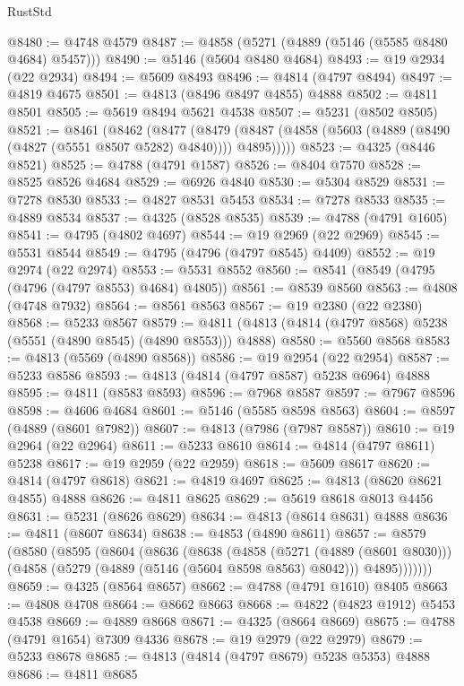 \begin{lexlean}{RustStd}
\begin{coremodule}
@8480 := @4748 @4579
@8487 := @4858 (@5271 (@4889 (@5146 (@5585 @8480 @4684) @5457)))
@8490 := @5146 (@5604 @8480 @4684)
@8493 := @19 @2934 (@22 @2934)
@8494 := @5609 @8493
@8496 := @4814 (@4797 @8494)
@8497 := @4819 @4675
@8501 := @4813 (@8496 @8497 @4855) @4888
@8502 := @4811 @8501
@8505 := @5619 @8494 @5621 @4538
@8507 := @5231 (@8502 @8505)
@8521 := @8461
    (@8462
      (@8477
        (@8479 (@8487 (@4858 (@5603 (@4889 (@8490 (@4827 (@5551 @8507 @5282) @4840)))) @4895)))))
@8523 := @4325 (@8446 @8521)
@8525 := @4788 (@4791 @1587)
@8526 := @8404 @7570
@8528 := @8525 @8526 @4684
@8529 := @6926 @4840
@8530 := @5304 @8529
@8531 := @7278 @8530
@8533 := @4827 @8531 @5453
@8534 := @7278 @8533
@8535 := @4889 @8534
@8537 := @4325 (@8528 @8535)
@8539 := @4788 (@4791 @1605)
@8541 := @4795 (@4802 @4697)
@8544 := @19 @2969 (@22 @2969)
@8545 := @5531 @8544
@8549 := @4795 (@4796 (@4797 @8545) @4409)
@8552 := @19 @2974 (@22 @2974)
@8553 := @5531 @8552
@8560 := @8541 (@8549 (@4795 (@4796 (@4797 @8553) @4684) @4805))
@8561 := @8539 @8560
@8563 := @4808 (@4748 @7932)
@8564 := @8561 @8563
@8567 := @19 @2380 (@22 @2380)
@8568 := @5233 @8567
@8579 := @4811 (@4813 (@4814 (@4797 @8568) @5238 (@5551 (@4890 @8545) (@4890 @8553))) @4888)
@8580 := @5560 @8568
@8583 := @4813 (@5569 (@4890 @8568))
@8586 := @19 @2954 (@22 @2954)
@8587 := @5233 @8586
@8593 := @4813 (@4814 (@4797 @8587) @5238 @6964) @4888
@8595 := @4811 (@8583 @8593)
@8596 := @7968 @8587
@8597 := @7967 @8596
@8598 := @4606 @4684
@8601 := @5146 (@5585 @8598 @8563)
@8604 := @8597 (@4889 (@8601 @7982))
@8607 := @4813 (@7986 (@7987 @8587))
@8610 := @19 @2964 (@22 @2964)
@8611 := @5233 @8610
@8614 := @4814 (@4797 @8611) @5238
@8617 := @19 @2959 (@22 @2959)
@8618 := @5609 @8617
@8620 := @4814 (@4797 @8618)
@8621 := @4819 @4697
@8625 := @4813 (@8620 @8621 @4855) @4888
@8626 := @4811 @8625
@8629 := @5619 @8618 @8013 @4456
@8631 := @5231 (@8626 @8629)
@8634 := @4813 (@8614 @8631) @4888
@8636 := @4811 (@8607 @8634)
@8638 := @4853 (@4890 @8611)
@8657 := @8579
    (@8580
      (@8595
        (@8604
          (@8636
            (@8638
              (@4858
                (@5271 (@4889 (@8601 @8030)))
                (@4858 (@5279 (@4889 (@5146 (@5604 @8598 @8563) @8042))) @4895)))))))
@8659 := @4325 (@8564 @8657)
@8662 := @4788 (@4791 @1610) @8405
@8663 := @4808 @4708
@8664 := @8662 @8663
@8668 := @4822 (@4823 @1912) @5453 @4538
@8669 := @4889 @8668
@8671 := @4325 (@8664 @8669)
@8675 := @4788 (@4791 @1654) @7309 @4336
@8678 := @19 @2979 (@22 @2979)
@8679 := @5233 @8678
@8685 := @4813 (@4814 (@4797 @8679) @5238 @5353) @4888
@8686 := @4811 @8685

\end{coremodule}
\end{lexlean}
